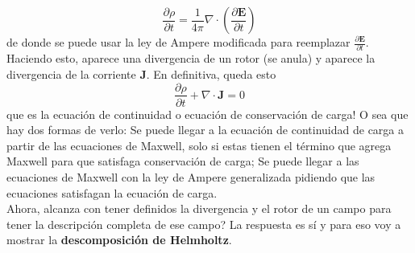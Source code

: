\begin{equation*}
    \frac{\partial \rho}{\partial t} 
    = \frac{1}{4\pi}\nabla \cdot 
    \left(
        \frac{\partial \textbf{E}}{\partial t}
    \right)
\end{equation*}
de donde se puede usar la ley de Ampere modificada para reemplazar $\frac{\partial \textbf{E}}{\partial t}$. Haciendo esto, aparece una divergencia de un rotor (se anula) y aparece la divergencia de la corriente $\textbf{J}$. En definitiva, queda esto
\begin{equation}
    \frac{\partial \rho}{\partial t} + \nabla \cdot \textbf{J} = 0
        \label{ec:EcuacionDeContinuidad}
\end{equation}
que es la ecuación de continuidad o ecuación de conservación de carga! O sea que hay dos formas de verlo: Se puede llegar a la ecuación de continuidad de carga a partir de las ecuaciones de Maxwell, solo si estas tienen el término que agrega Maxwell para que satisfaga conservación de carga; Se puede llegar a las ecuaciones de Maxwell con la ley de Ampere generalizada pidiendo que las ecuaciones satisfagan la ecuación de carga.\\
\indent Ahora, alcanza con tener definidos la divergencia y el rotor de un campo para tener la descripción completa de ese campo? La respuesta es sí y para eso voy a mostrar la \textbf{descomposición de Helmholtz}.




